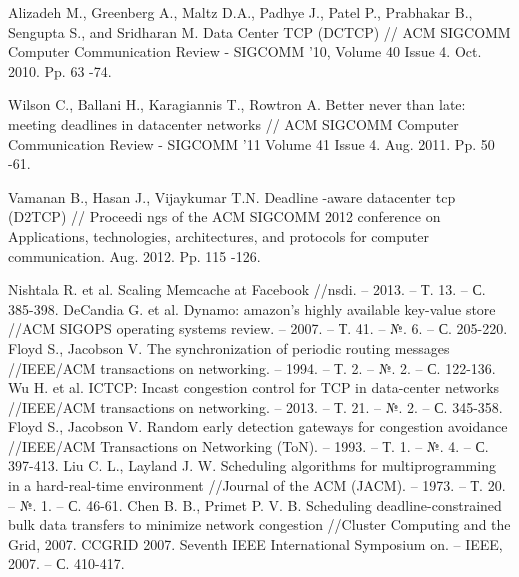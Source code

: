 \documentclass[14pt, a4paper,oneside]{extarticle}
\begin{document}
\newpage
\begin{thebibliography}{9}

Alizadeh M., Greenberg A., Maltz
 D.A., Padhye J., Patel P., Prabhakar B., 
Sengupta S., and Sridharan M. Data Center TCP (DCTCP) // ACM SIGCOMM 
Computer Communication Review -
 SIGCOMM '10, Volume 40 Issue 4. Oct. 
2010. Pp. 63
-74.

Wilson C., Ballani H., Karagiannis T., Rowtron
 A. Better never than late: meeting 
deadlines in datacenter networks // ACM SIGCOMM Computer Communication 
Review 
- SIGCOMM '11 Volume 41 Issue 4. Aug. 2011. Pp. 50
-61. 

Vamanan B., Hasan J., Vijaykumar T.N. Deadline
-aware datacenter tcp (D2TCP) 
// Proceedi
ngs of the ACM SIGCOMM 2012 conference on Applications, 
technologies, architectures, and protocols for computer communication. Aug. 
2012. Pp. 115
-126. 

Nishtala R. et al. Scaling Memcache at Facebook //nsdi. – 2013. – Т. 13. – С. 385-398.
DeCandia G. et al. Dynamo: amazon's highly available key-value store //ACM SIGOPS operating systems review. – 2007. – Т. 41. – №. 6. – С. 205-220.
Floyd S., Jacobson V. The synchronization of periodic routing messages //IEEE/ACM transactions on networking. – 1994. – Т. 2. – №. 2. – С. 122-136.
Wu H. et al. ICTCP: Incast congestion control for TCP in data-center networks //IEEE/ACM transactions on networking. – 2013. – Т. 21. – №. 2. – С. 345-358.
Floyd S., Jacobson V. Random early detection gateways for congestion avoidance //IEEE/ACM Transactions on Networking (ToN). – 1993. – Т. 1. – №. 4. – С. 397-413.
Liu C. L., Layland J. W. Scheduling algorithms for multiprogramming in a hard-real-time environment //Journal of the ACM (JACM). – 1973. – Т. 20. – №. 1. – С. 46-61.
Chen B. B., Primet P. V. B. Scheduling deadline-constrained bulk data transfers to minimize network congestion //Cluster Computing and the Grid, 2007. CCGRID 2007. Seventh IEEE International Symposium on. – IEEE, 2007. – С. 410-417.

\end{thebibliography}
\end{document}
